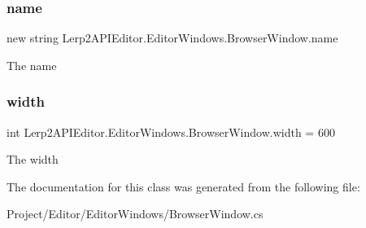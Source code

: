 \subsubsection{\texorpdfstring{name}{name}}
{\footnotesize\ttfamily new string Lerp2\+A\+P\+I\+Editor.\+Editor\+Windows.\+Browser\+Window.\+name}



The name 

\mbox{\label{class_lerp2_a_p_i_editor_1_1_editor_windows_1_1_browser_window_ae39ade89001edd898154cc3b7c038317}} 
\subsubsection{\texorpdfstring{width}{width}}
{\footnotesize\ttfamily int Lerp2\+A\+P\+I\+Editor.\+Editor\+Windows.\+Browser\+Window.\+width = 600}



The width 



The documentation for this class was generated from the following file\+:\begin{DoxyCompactItemize}
\item 
Project/\+Editor/\+Editor\+Windows/Browser\+Window.\+cs\end{DoxyCompactItemize}
